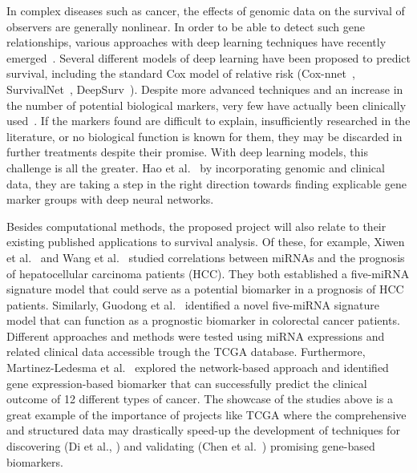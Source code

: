 \documentclass[11pt,a4paper]{article}
\begin{document}
In complex diseases such as cancer, the effects of genomic data on the survival of observers are generally  nonlinear. In order to be able to detect such gene relationships, various approaches with deep learning techniques have recently emerged~\cite{hao2019interpretable}. Several different models of deep learning have been proposed to predict survival, including the standard Cox model of relative risk (Cox-nnet~\cite{ching2018cox}, SurvivalNet~\cite {yousefi2017predicting}, DeepSurv~\cite{katzman2018deepsurv}). Despite more advanced techniques and an increase in the number of potential biological markers, very few have actually been clinically used~\cite{burke2016predicting}. If the markers found are difficult to explain, insufficiently researched in the literature, or no biological function is known for them, they may be discarded in further treatments despite their promise. With deep learning models, this challenge is all the greater. Hao et al.~\cite {hao2019interpretable} by incorporating genomic and clinical data, they are taking a step in the right direction towards finding explicable gene marker groups with deep neural networks.

Besides computational methods, the proposed project will also relate to their existing published applications to survival analysis. Of these, for example, Xiwen et al.~\cite{29713196} and Wang et al.~\cite{33313167} studied correlations between miRNAs and the prognosis of hepatocellular carcinoma patients (HCC). They both established a five-miRNA signature model that could serve as a potential biomarker in a prognosis of HCC patients. Similarly, Guodong et al.~\cite{31799184} identified a novel five-miRNA signature model that can function as a prognostic biomarker in colorectal cancer patients. Different approaches and methods were tested using miRNA expressions and related clinical data accessible trough the TCGA database. Furthermore, Martinez-Ledesma et al.~\cite{26202601} explored the network-based approach and identified gene expression-based biomarker that can successfully predict the clinical outcome of 12 different types of cancer. The showcase of the studies above is a great example of the importance of projects like TCGA where the comprehensive and structured data may drastically speed-up the development of techniques for discovering (Di et al., \cite{29676997}) and validating (Chen et al.~\cite{32289666}) promising gene-based biomarkers.

\end{document}
